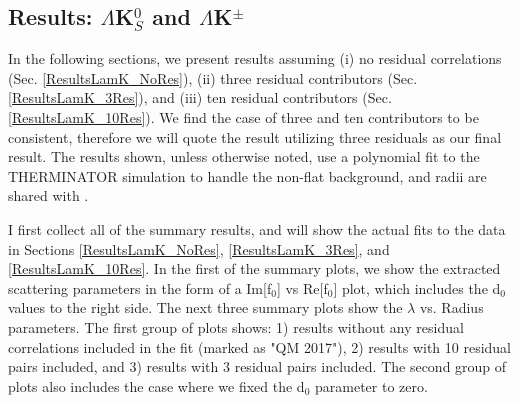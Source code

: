 \documentclass[../AnalysisNoteJBuxton.tex]{subfiles}
\begin{document}
\subsection{Results: \texorpdfstring{$\Lambda$K$^{0}_{S}$ and $\Lambda$K$^{\pm}$}{TEXT}}
\label{ResultsLamK}

In the following sections, we present results assuming (i) no residual correlations (Sec. \ref{ResultsLamK_NoRes}), (ii) three residual contributors (Sec. \ref{ResultsLamK_3Res}), and (iii) ten residual contributors (Sec. \ref{ResultsLamK_10Res}).  We find the case of three and ten contributors to be consistent, therefore we will quote the result utilizing three residuals as our final result.  The results shown, unless otherwise noted, use a polynomial fit to the THERMINATOR simulation to handle the non-flat background, and \LamKchPALamKchM radii are shared with \LamKchMALamKchP.


I first collect all of the summary results, and will show the actual fits to the data in Sections \ref{ResultsLamK_NoRes}, \ref{ResultsLamK_3Res}, and \ref{ResultsLamK_10Res}.  In the first of the summary plots, we show the extracted scattering parameters in the form of a Im[f$_{0}$] vs Re[f$_{0}$] plot, which includes the d$_{0}$ values to the right side.  The next three summary plots show the $\lambda$ vs. Radius parameters.  The first group of plots shows: 1) results without any residual correlations included in the fit (marked as "QM 2017"), 2) results with 10 residual pairs included, and 3) results with 3 residual pairs included.  The second group of plots also includes the case where we fixed the d$_{0}$ parameter to zero.
\end{document}
